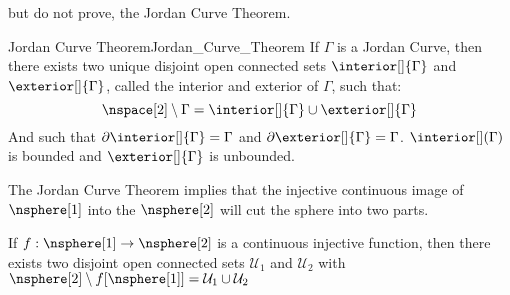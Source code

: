 \documentclass{book}                                                           %
\begin{document}
                but do not prove, the Jordan Curve Theorem.
                \begin{ftheorem}{Jordan Curve Theorem}{Jordan_Curve_Theorem}
                    If $\Gamma$ is a Jordan Curve, then there exists two unique
                    disjoint open connected sets $\interior[]{\Gamma}$ and
                    $\exterior[]{\Gamma}$, called the interior and exterior of
                    $\Gamma$, such that:
                    \begin{equation*}
                        \nspace[2]\setminus\Gamma
                            =\interior[]{\Gamma}\cup\exterior[]{\Gamma}
                    \end{equation*}
                    And such that $\partial\interior[]{\Gamma}=\Gamma$ and
                    $\partial\exterior[]{\Gamma}=\Gamma$. $\interior[](\Gamma)$
                    is bounded and $\exterior[]{\Gamma}$ is unbounded.
                \end{ftheorem}
                The Jordan Curve Theorem implies that the injective continuous
                image of $\nsphere[1]$ into the $\nsphere[2]$ will cut the
                sphere into two parts.
                \begin{theorem}
                    \label{thm:Sphere_Without_Circle_Is_Disconnected}
                    If $f:\nsphere[1]\rightarrow\nsphere[2]$ is a continuous
                    injective function, then there exists two disjoint open
                    connected sets $\mathcal{U}_{1}$ and $\mathcal{U}_{2}$ with
                    $\nsphere[2]\setminus{f}[\nsphere[1]]%
                    =\mathcal{U}_{1}\cup\mathcal{U}_{2}$
                \end{theorem}
\end{document}

